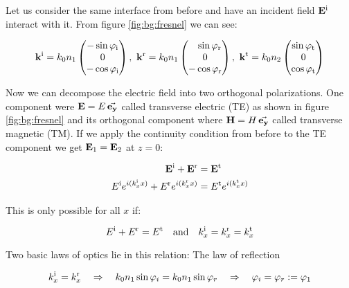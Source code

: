 Let us consider the same interface from before and have an incident field
$\vb E^{\mathrm{i}}$ interact with it. From figure \ref{fig:bg:fresnel} we can see:

\begin{equation} \label{eq:bg:k}
    \vb k^{\mathrm{i}} = k_0 n_1
    \begin{pmatrix}
        -\sin \varphi_{\mathrm{i}}\\ 0\\ -\cos \varphi_{\mathrm{i}}
    \end{pmatrix}
    , \
    \vb k^{\mathrm{r}} = k_0 n_1
    \begin{pmatrix}
        \phantom{-} \sin \varphi_{\mathrm{r}} \\ 0\\ -\cos \varphi_{\mathrm{r}}
    \end{pmatrix}
    , \
    \vb k^{\mathrm{t}} = k_0 n_2
    \begin{pmatrix}
        \sin \varphi_{\mathrm{t}}\\ 0\\ \cos \varphi_{\mathrm{t}}
    \end{pmatrix}
\end{equation}

Now we can decompose the electric field into two orthogonal polarizations. One component were $\vb E = E \, \va{e_y}$ called transverse electric (TE) as shown in figure \ref{fig:bg:fresnel} and its orthogonal component where $\vb H = H \, \va{e_y}$ called transverse magnetic (TM). If we apply the continuity condition from before to the TE component we get $\vb E_1 = \vb E_2$ at $z = 0$:

\begin{equation}
\begin{aligned}
    \vb E^{\mathrm{i}} + \vb E^{\mathrm{r}} &= \vb E^{\mathrm{t}} \\
    E^{\mathrm{i}} e^{i(k^{\mathrm{i}}_x x)} + E^{\mathrm{r}} e^{i(k^{\mathrm{r}}_x x)}
    &= E^{\mathrm{t}} e^{i(k^{\mathrm{t}}_x x)}
\end{aligned}
\end{equation}

This is only possible for all $x$ if:

\begin{equation} \label{eq:bg:x}
    E^\s{i} + E^\s{r} = E^\s{t} \qq{and}
    k^\s{i}_x = k^\s{r}_x = k^\s{t}_x
\end{equation}

Two basic laws of optics lie in this relation: The law of reflection

\begin{equation}
    k^{\mathrm{i}}_x = k^{\mathrm{r}}_x
    \quad \Rightarrow \quad
    k_0 n_1 \sin \varphi_i =  k_0 n_1 \sin \varphi_r
    \quad \Rightarrow \quad
    \varphi_i = \varphi_r := \varphi_1
\end{equation}


